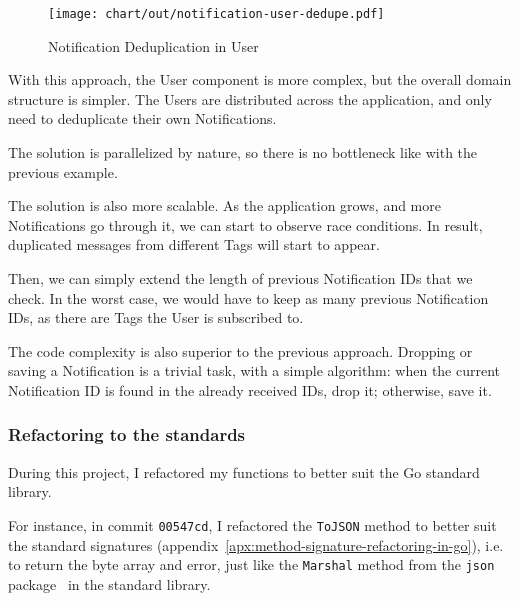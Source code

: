 \begin{figure}[h]
  \centering
  \texttt{[image: chart/out/notification-user-dedupe.pdf]}
  \caption{Notification Deduplication in User}
  \label{fig:notification-user-dedupe}
\end{figure}

With this approach,
the User component is more complex,
but the overall domain structure is simpler.
The Users are distributed across the application,
and only need to deduplicate their own Notifications.

The solution is parallelized by nature,
so there is no bottleneck
like with the previous example.

The solution is also more scalable.
As the application grows,
and more Notifications go through it,
we can start to observe race conditions.
In result,
duplicated messages from different Tags
will start to appear.

Then, we can simply extend the length of
previous Notification IDs that we check.
In the worst case,
we would have to keep as many previous
Notification IDs,
as there are Tags the User is subscribed to.

The code complexity is also superior
to the previous approach.
Dropping or saving a Notification is a trivial task,
with a simple algorithm:
when the current Notification ID is found in the
already received IDs, drop it; otherwise, save it.

\subsubsection{Refactoring to the standards}\label{sec:refactoring-to-the-standards}

During this project,
I refactored my functions to better suit
the Go standard library.

For instance,
in commit \texttt{00547cd},
I refactored the \texttt{ToJSON} method
to better suit the standard signatures
(appendix~\ref{apx:method-signature-refactoring-in-go}),
i.e. to return the byte array and error,
just like the \texttt{Marshal} method
from the \texttt{json} package~\cite{cox_json_2022}
in the standard library.

